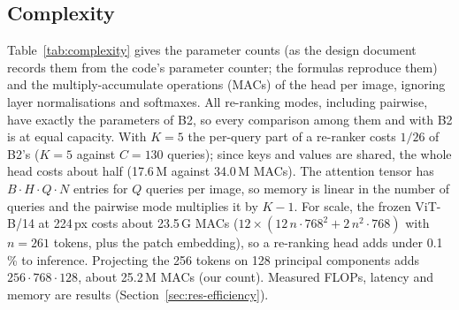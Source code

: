 \documentclass[11pt,a4paper]{article}
\theoremstyle{plain}
\begin{document}
\subsection{Complexity}\label{sec:complexity}
Table~\ref{tab:complexity} gives the parameter counts (as the design document records them from the code's
parameter counter; the formulas reproduce them) and the multiply-accumulate operations (MACs) of the head per image,
ignoring layer normalisations and softmaxes. All re-ranking modes,
including pairwise, have exactly the parameters of B2, so every comparison among them and with B2 is at equal
capacity. With $K=5$ the per-query part of a re-ranker costs $1/26$ of B2's ($K=5$ against $C=130$ queries); since
keys and values are shared, the whole head costs about half (17.6\,M against 34.0\,M MACs). The attention tensor has
$B\cdot H\cdot Q\cdot N$ entries for $Q$ queries per image, so memory is linear in the number of queries and the
pairwise mode multiplies it by $K-1$. For scale, the frozen ViT-B/14 at 224\,px costs about 23.5\,G MACs
($12\times(12\,n\cdot768^2+2\,n^2\cdot768)$ with $n=261$ tokens, plus the patch embedding), so a re-ranking head adds
under 0.1\,\% to inference. Projecting the 256 tokens on 128 principal components adds $256\cdot768\cdot128$, about
25.2\,M MACs (our count). Measured FLOPs, latency and memory are results (Section~\ref{sec:res-efficiency}).
\end{document}
